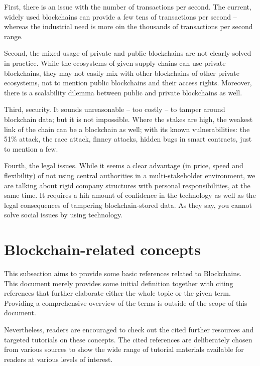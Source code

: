 \documentclass[a4paper]{article}
\begin{document}
First, there is an issue with the number of transactions per second. The current, widely used blockchains can provide a few tens of transactions per second -- whereas the industrial need is more oin the thousands of transactions per second range. 

Second, the mixed usage of private and public blockchains are not clearly solved in practice. While the ecosystems of given supply chains can use private blockchains, they may not easily mix with other blockchains of other private ecosystems, not to mention public blockchains and their access rights. Moreover, there is a scalability dilemma between public and private blockchains as well.

Third, security. It sounds unreasonable -- too costly -- to tamper around blockchain data; but it is not impossible. Where the stakes are high, the weakest link of the chain can be a blockchain as well; with its known vulnerabilities: the 51\% attack, the race attack, finney attacks, hidden bugs in smart contracts, just to mention a few.

Fourth, the legal issues. While it seems a clear advantage (in price, speed and flexibility) of not using central authorities in a multi-stakeholder environment, we are talking about rigid company structures with personal responsibilities, at the same time. It requires a hih amount of confidence in the technology as well as the legal consequences of tampering blockchain-stored data. As they say, you cannot solve social issues by using technology.



\section{Blockchain-related concepts}

This subsection aims to provide some basic references related to Blockchains. This document merely provides some initial definition together with citing references that further elaborate either the whole topic or the given term. Providing a comprehensive overview of the terms is outside of the scope of this document.

Nevertheless, readers are encouraged to check out the cited further resources and targeted tutorials on these concepts. The cited references are deliberately chosen from various sources to show the wide range of tutorial materials available for readers at various levels of interest. 
\end{document}
